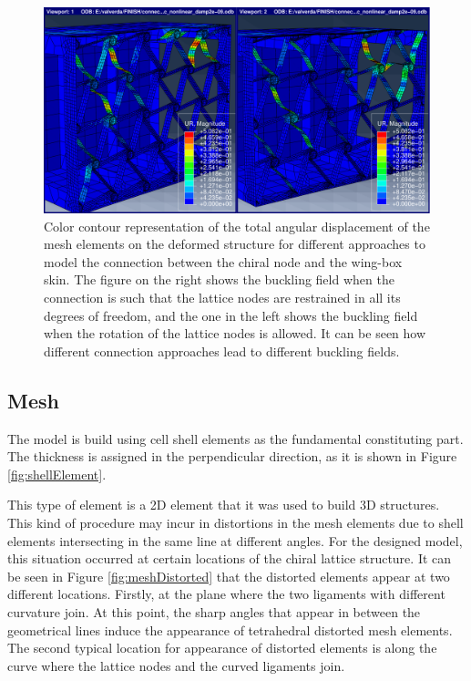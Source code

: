     \begin{figure}[!htpb]
      \centering
      \includegraphics[width=0.8 \textwidth]{figures/further/connectionUR3}
      \caption[Color contour representation of the total angular displacement of the mesh elements on the deformed structure for different approaches to model the connection between the chiral node and the wing-box skin]{Color contour representation of the total angular displacement of the mesh elements on the deformed structure for different approaches to model the connection between the chiral node and the wing-box skin. The figure on the right shows the buckling field when the connection is such that the lattice nodes are restrained in all its degrees of freedom, and the one in the left shows the buckling field when the rotation of the lattice nodes is allowed. It can be seen how different connection approaches lead to different buckling fields.}
      \label{fig:connectionUR3}
    \end{figure}

  \clearpage
  \subsection{Mesh} \label{subsec:mesh_results_model}

    The model is build using cell shell elements as the fundamental constituting part. The thickness is assigned in the perpendicular direction, as it is shown in Figure \ref{fig:shellElement}.

    This type of element is a 2D element that it was used to build 3D structures. This kind of procedure may incur in distortions in the mesh elements due to shell elements intersecting in the same line at different angles. For the designed model, this situation occurred at certain locations of the chiral lattice structure. It can be seen in Figure \ref{fig:meshDistorted} that the distorted elements appear at two different locations. Firstly, at the plane where the two ligaments with different curvature join. At this point, the sharp angles that appear in between the geometrical lines induce the appearance of tetrahedral distorted mesh elements. The second typical location for appearance of distorted elements is along the curve where the lattice nodes and the curved ligaments join.

